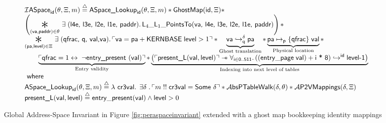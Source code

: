 \begin{figure*}
\footnotesize
\[
\begin{array}{l}
  \mathcal{I}\textsf{ASpace}_{\textsf{id}}(\ptablestore,\Xi,m)\stackrel{\triangle}{=} \textsf{ASpace\_Lookup}_{\textsf{id}}(\ptablestore,\Xi,m) \ast \mathsf{GhostMap}(\mathsf{id},\Xi)\ast\\
  \left(\bigast{(\vaddr, \textsf{paddr})\in \ptablestore}{\exists\;(\textsf{l4e, l3e, l2e, l1e, paddr})\ldotp \textsf{L}_{4}\_\textsf{L}_{1}\_\textsf{PointsTo}(\vaddr\textsf{, l4e, l3e, l2e, l1e, paddr})}\right)\ast \\
  \bigast{(\paddr,\mathsf{level}) \in \Xi}{\exists\; (\textsf{qfrac, q, val,}\vaddr) \ldotp \ulcorner \vaddr = \paddr + \textsf{KERNBASE} \; \textsf{level} > 1\urcorner \ast  \underbrace{\fracghostmaptoken{\delta}{\vaddr}{\paddr}{\qfrac} }_\text{Ghost translation} \ast \underbrace{\paddr \mapsto_{\mathsf{p}}\{\textsf{qfrac}\}\; \vale}_\text{Physical location}} \ast\\
   \qquad\underbrace{ \ulcorner \textsf{qfrac} = 1 \leftrightarrow \; \lnot\textsf{entry\_present }(\vale) \urcorner}_\text{Entry validity}\ast 
    \underbrace{\left(\ulcorner\textsf{present\_L}(\vale,\mathsf{level})\urcorner \wand \forall_{\textsf{i}\in\textsf{0..511}} \ldotp \ghostmaptoken{\textsf{id}}{((\mathsf{entry\_page}\;\vale) + \textsf{i * 8})}{\textsf{level-1}}\right)}_{\text{Indexing into next level of tables}} \\
  \textsf{ where } \\
   \textsf{ASpace\_Lookup}_{\textsf{id}}(\ptablestore,\Xi,m) \stackrel{\triangle}{=} \lambda\textsf{ cr3val} \ldotp \; \exists \gammaPred \; \ldotp \ulcorner m \; !!\; \textsf{cr3val} = \textsf{Some } \gammaPred \urcorner \ast
   \ptableabswalk{\delta,\ptablestore} \ast \pvmapping{\delta,\Xi}\\
  \textsf{present\_L}(\vale,\mathsf{level})\stackrel{\triangle}{=} \mathsf{entry\_present}(\vale)\land \mathsf{level} > 0
  
\end{array}
\]
\vspace{-1em}
\caption{Global Address-Space Invariant in Figure \ref{fig:peraspaceinvariant} extended with a ghost map bookkeeping identity mappings }
  \label{fig:peraspaceinvariant_with_p2v_extension}
\vspace{-1em}
\end{figure*}

